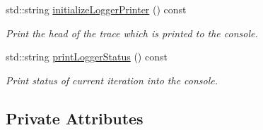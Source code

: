 \begin{DoxyCompactItemize}
$$std\+::string \mbox{\hyperlink{classlogger_1_1_oob_risk_logger_afb230d22eea9b1c025e6ff95685c692c}{initialize\+Logger\+Printer}} () const
\begin{DoxyCompactList}\small\item\em Print the head of the trace which is printed to the console. \end{DoxyCompactList}\item 
std\+::string \mbox{\hyperlink{classlogger_1_1_oob_risk_logger_acab1638b5112232c86c2208b91f649fb}{print\+Logger\+Status}} () const
\begin{DoxyCompactList}\small\item\em Print status of current iteration into the console. \end{DoxyCompactList}\end{DoxyCompactItemize}
\subsection*{Private Attributes}

